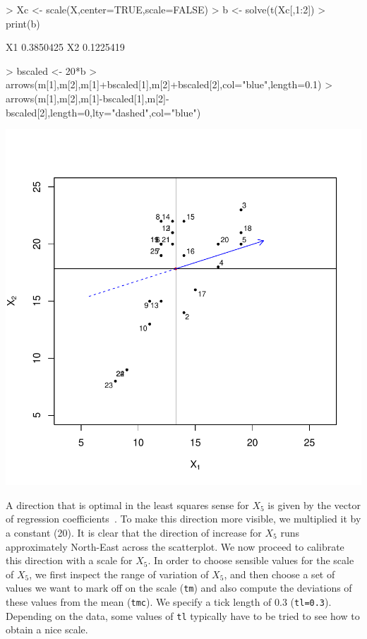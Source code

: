 \documentclass[a4paper]{article}
\begin{document}
\begin{Schunk}
\begin{Sinput}
> Xc <- scale(X,center=TRUE,scale=FALSE)
> b <- solve(t(Xc[,1:2])%
> print(b)
\end{Sinput}
\begin{Soutput}
        [,1]
X1 0.3850425
X2 0.1225419
\end{Soutput}
\begin{Sinput}
> bscaled <- 20*b
> arrows(m[1],m[2],m[1]+bscaled[1],m[2]+bscaled[2],col="blue",length=0.1)
> arrows(m[1],m[2],m[1]-bscaled[1],m[2]-bscaled[2],length=0,lty="dashed",col="blue")
\end{Sinput}
\end{Schunk}
\includegraphics{CalibrationGuide-005}

A direction that is optimal in the least squares sense for $X_5$ is given by the vector of regression
coefficients~\cite{Graffel13}. To make this direction more visible, we multiplied it by a constant (20). 
It is clear that the direction of increase for $X_5$ runs approximately North-East across the scatterplot. 
We now proceed to calibrate this direction with a scale for $X_5$. In order to choose sensible values for
the scale of $X_5$, we first inspect the range of variation of $X_5$, and then choose a set of values we want
to mark off on the scale ({\tt tm}) and also compute the deviations of these values from the mean 
({\tt tmc}). We specify a tick length of 0.3 ({\tt tl=0.3}). Depending on the data, some values of {\tt tl}
typically have to be tried to see how to obtain a nice scale. 
\end{document}
